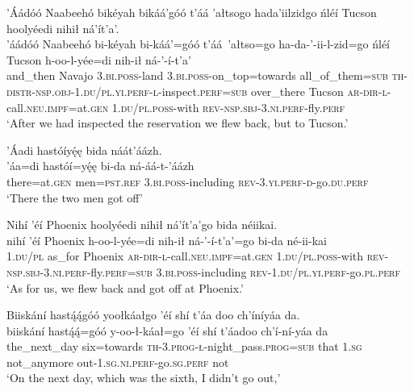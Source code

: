 \ea\label{ex:text9-6-5}
’Áádóó Naabeehó bikéyah bikáá’góó t’áá ’ałtsogo hada’iilzidgo ńléí Tucson hoolyéedi nihił ná’ít’a’.\\
\gll ’áádóó	Naabeehó	bi-kéyah	bi-káá’=góó	t’áá~{’ałtso=go}	ha-da-’-ii-l-zid=go	ńléí	Tucson	h-oo-l-yée=di	nih-ił	ná-’-í-t’a’\\
     and\_then	Navajo	3.\textsc{bi}.\textsc{poss}-land	3.\textsc{bi}.\textsc{poss}-on\_top=towards	all\_of\_them=\textsc{sub}	\textsc{th}-\textsc{distr}-\textsc{nsp}.\textsc{obj}-1.\textsc{du}/\textsc{pl}.\textsc{yi}.\textsc{perf}-\textsc{l}-inspect.\textsc{perf}=\textsc{sub}	over\_there	Tucson	\textsc{ar}-\textsc{dir}-\textsc{l}-call.\textsc{neu}.\textsc{impf}=at.\textsc{gen}	1.\textsc{du}/\textsc{pl}.\textsc{poss}-with	\textsc{rev}-\textsc{nsp}.\textsc{sbj}-3.\textsc{ni}.\textsc{perf}-fly.\textsc{perf}\\
\glt `After we had inspected the reservation we flew back, but to Tucson.'
\z

\ea\label{ex:text9-6-6}
’Áadi hastóíyę́ę bida náát’áázh.\\
\gll ’áa=di	hastóí=yę́ę	bi-da	ná-áá-t-’áázh\\
     there=at.\textsc{gen}	men=\textsc{pst}.\textsc{ref}	3.\textsc{bi}.\textsc{poss}-including	\textsc{rev}-3.\textsc{yi}.\textsc{perf}-\textsc{d}-go.\textsc{du}.\textsc{perf}\\
\glt `There the two men got off'
\z

\ea\label{ex:text9-6-7}
Nihí ’éí Phoenix hoolyéedi nihił ná’ít’a’go bida néiikai.\\
\gll nihí	’éí	Phoenix	h-oo-l-yée=di	nih-ił	ná-’-í-t’a’=go	bi-da	né-ii-kai\\
     1.\textsc{du}/\textsc{pl}	as\_for	Phoenix	\textsc{ar}-\textsc{dir}-\textsc{l}-call.\textsc{neu}.\textsc{impf}=at.\textsc{gen}	1.\textsc{du}/\textsc{pl}.\textsc{poss}-with	\textsc{rev}-\textsc{nsp}.\textsc{sbj}-3.\textsc{ni}.\textsc{perf}-fly.\textsc{perf}=\textsc{sub}	3.\textsc{bi}.\textsc{poss}-including	\textsc{rev}-1.\textsc{du}/\textsc{pl}.\textsc{yi}.\textsc{perf}-go.\textsc{pl}.\textsc{perf}\\
\glt `As for us, we flew back and got off at Phoenix.'
\z

\ea\label{ex:text9-7-1}
Biiskání hastą́ą́góó yoołkáałgo ’éí shí t’áa doo ch’íníyáa da.\\
\gll biiskání	hastą́ą́=góó	y-oo-ł-káał=go	’éí	shí	t’áadoo	ch’í-ní-yáa	da\\
     the\_next\_day	six=towards	\textsc{th}-3.\textsc{prog}-\textsc{ł}-night\_pass.\textsc{prog}=\textsc{sub}	that	1.\textsc{sg}	not\_anymore	out-1.\textsc{sg}.\textsc{ni}.\textsc{perf}-go.\textsc{sg}.\textsc{perf}	not\\
\glt `On the next day, which was the sixth, I didn't go out,'
\z

